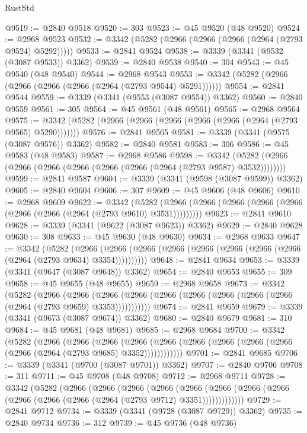\begin{lexlean}{RustStd}
\begin{coremodule}
@9519 := @2840 @9518
@9520 := 303
@9523 := @45 @9520 (@48 @9520)
@9524 := @2968 @9523
@9532 := @3342 (@5282 (@2966 (@2966 (@2966 (@2964 (@2793 @9524) @5292)))))
@9533 := @2841 @9524
@9538 := @3339 (@3341 (@9532 (@3087 @9533)) @3362)
@9539 := @2840 @9538
@9540 := 304
@9543 := @45 @9540 (@48 @9540)
@9544 := @2968 @9543
@9553 := @3342 (@5282 (@2966 (@2966 (@2966 (@2966 (@2964 (@2793 @9544) @5291))))))
@9554 := @2841 @9544
@9559 := @3339 (@3341 (@9553 (@3087 @9554)) @3362)
@9560 := @2840 @9559
@9561 := 305
@9564 := @45 @9561 (@48 @9561)
@9565 := @2968 @9564
@9575 := @3342 (@5282 (@2966 (@2966 (@2966 (@2966 (@2966 (@2964 (@2793 @9565) @5290)))))))
@9576 := @2841 @9565
@9581 := @3339 (@3341 (@9575 (@3087 @9576)) @3362)
@9582 := @2840 @9581
@9583 := 306
@9586 := @45 @9583 (@48 @9583)
@9587 := @2968 @9586
@9598 := @3342 (@5282 (@2966 (@2966 (@2966 (@2966 (@2966 (@2966 (@2964 (@2793 @9587) @3532))))))))
@9599 := @2841 @9587
@9604 := @3339 (@3341 (@9598 (@3087 @9599)) @3362)
@9605 := @2840 @9604
@9606 := 307
@9609 := @45 @9606 (@48 @9606)
@9610 := @2968 @9609
@9622 := @3342
    (@5282 (@2966 (@2966 (@2966 (@2966 (@2966 (@2966 (@2966 (@2964 (@2793 @9610) @3531)))))))))
@9623 := @2841 @9610
@9628 := @3339 (@3341 (@9622 (@3087 @9623)) @3362)
@9629 := @2840 @9628
@9630 := 308
@9633 := @45 @9630 (@48 @9630)
@9634 := @2968 @9633
@9647 := @3342
    (@5282
      (@2966 (@2966 (@2966 (@2966 (@2966 (@2966 (@2966 (@2966 (@2964 (@2793 @9634) @3354))))))))))
@9648 := @2841 @9634
@9653 := @3339 (@3341 (@9647 (@3087 @9648)) @3362)
@9654 := @2840 @9653
@9655 := 309
@9658 := @45 @9655 (@48 @9655)
@9659 := @2968 @9658
@9673 := @3342
    (@5282
      (@2966
        (@2966
          (@2966 (@2966 (@2966 (@2966 (@2966 (@2966 (@2966 (@2964 (@2793 @9659) @3353)))))))))))
@9674 := @2841 @9659
@9679 := @3339 (@3341 (@9673 (@3087 @9674)) @3362)
@9680 := @2840 @9679
@9681 := 310
@9684 := @45 @9681 (@48 @9681)
@9685 := @2968 @9684
@9700 := @3342
    (@5282
      (@2966
        (@2966
          (@2966
            (@2966 (@2966 (@2966 (@2966 (@2966 (@2966 (@2966 (@2964 (@2793 @9685) @3352))))))))))))
@9701 := @2841 @9685
@9706 := @3339 (@3341 (@9700 (@3087 @9701)) @3362)
@9707 := @2840 @9706
@9708 := 311
@9711 := @45 @9708 (@48 @9708)
@9712 := @2968 @9711
@9728 := @3342
    (@5282
      (@2966
        (@2966
          (@2966
            (@2966
              (@2966
                (@2966 (@2966 (@2966 (@2966 (@2966 (@2966 (@2964 (@2793 @9712) @3351)))))))))))))
@9729 := @2841 @9712
@9734 := @3339 (@3341 (@9728 (@3087 @9729)) @3362)
@9735 := @2840 @9734
@9736 := 312
@9739 := @45 @9736 (@48 @9736)

\end{coremodule}
\end{lexlean}
